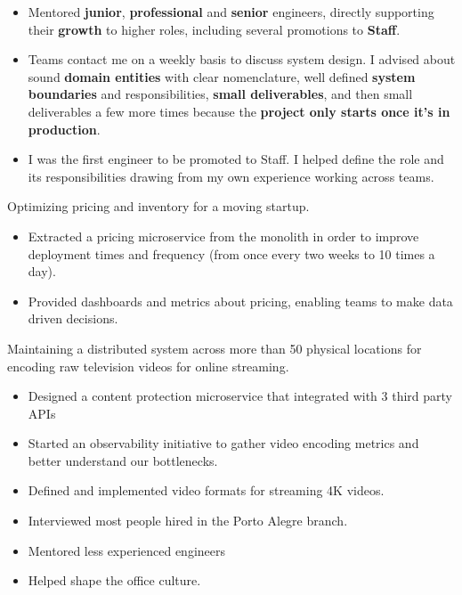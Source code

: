 \documentclass[10pt,a4paper,ragged2e,withhyper]{altacv}
\newcommand{\accentbold}[1]{\textbf{\textcolor{accent}{#1}}}
\begin{document}
\begin{paracol}{2}
{\begin{itemize}
\item Mentored \accentbold{junior}, \accentbold{professional} and \accentbold{senior} engineers, directly supporting their \accentbold{growth} to higher roles, including several promotions to \accentbold{Staff}.
\item Teams contact me on a weekly basis to discuss system design. I advised about sound \accentbold{domain entities} with clear nomenclature, well defined \accentbold{system boundaries} and responsibilities, \accentbold{small deliverables}, and then small deliverables a few more times because the \accentbold{project only starts once it's in production}.
\item I was the first engineer to be promoted to Staff. I helped define the role and its responsibilities drawing from my own experience working across teams.
\end{itemize}
}

\divider


{\RaggedRight
Optimizing pricing and inventory for a moving startup.

\medskip

\begin{itemize}
\item Extracted a pricing microservice from the monolith in order to improve deployment times and frequency (from once every two weeks to 10 times a day).
\item Provided dashboards and metrics about pricing, enabling teams to make data driven decisions.
\end{itemize}
}

\divider


{\RaggedRight
Maintaining a distributed system across more than 50 physical locations for encoding raw television videos for online streaming.

\medskip

\begin{itemize}
\item Designed a content protection microservice that integrated with 3 third party APIs
\item Started an observability initiative to gather video encoding metrics and better understand our bottlenecks.
\item Defined and implemented video formats for streaming 4K videos.
\item Interviewed most people hired in the Porto Alegre branch.
\item Mentored less experienced engineers
\item Helped shape the office culture.
\end{itemize}
}


\end{paracol}
\end{document}
